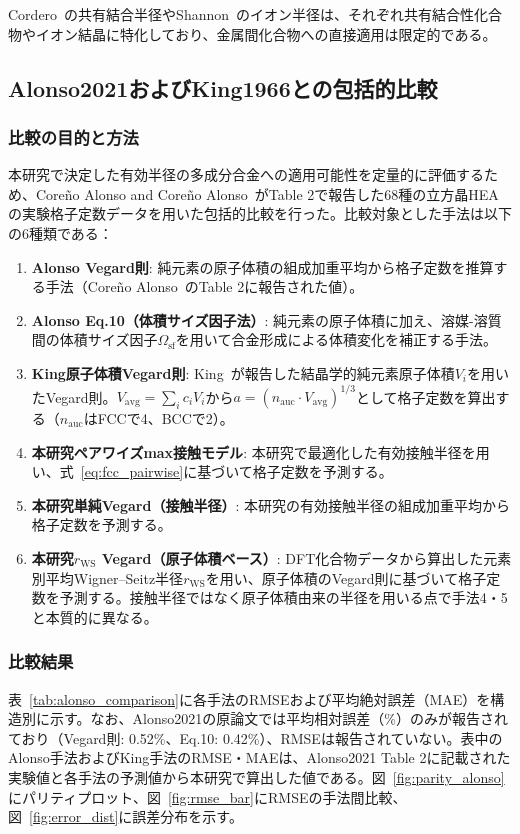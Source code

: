 \documentclass[a4paper,10pt,5p]{elsarticle}
\begin{document}
Cordero~\cite{cordero2008}の共有結合半径やShannon~\cite{shannon1976}のイオン半径は、それぞれ共有結合性化合物やイオン結晶に特化しており、金属間化合物への直接適用は限定的である。


\subsection{Alonso2021およびKing1966との包括的比較}

\subsubsection{比較の目的と方法}
本研究で決定した有効半径の多成分合金への適用可能性を定量的に評価するため、Coreño Alonso and Coreño Alonso~\cite{Alonso2021}がTable 2で報告した68種の立方晶HEAの実験格子定数データを用いた包括的比較を行った。比較対象とした手法は以下の6種類である：
\begin{enumerate}
\setlength{\parskip}{0cm}
\setlength{\itemsep}{0cm}
    \item \textbf{Alonso Vegard則}: 純元素の原子体積の組成加重平均から格子定数を推算する手法（Coreño Alonso~\cite{Alonso2021}のTable 2に報告された値）。
    \item \textbf{Alonso Eq.10（体積サイズ因子法）}: 純元素の原子体積に加え、溶媒-溶質間の体積サイズ因子$\Omega_\mathrm{sf}$を用いて合金形成による体積変化を補正する手法。
    \item \textbf{King原子体積Vegard則}: King~\cite{king1966}が報告した結晶学的純元素原子体積$V_i$を用いたVegard則。$V_\mathrm{avg} = \sum_i c_i V_i$から$a = (n_\mathrm{auc} \cdot V_\mathrm{avg})^{1/3}$として格子定数を算出する（$n_\mathrm{auc}$はFCCで4、BCCで2）。
    \item \textbf{本研究ペアワイズmax接触モデル}: 本研究で最適化した有効接触半径を用い、式~\ref{eq:fcc_pairwise}に基づいて格子定数を予測する。
    \item \textbf{本研究単純Vegard（接触半径）}: 本研究の有効接触半径の組成加重平均から格子定数を予測する。
    \item \textbf{本研究$r_\mathrm{WS}$ Vegard（原子体積ベース）}: DFT化合物データから算出した元素別平均Wigner--Seitz半径$r_\mathrm{WS}$を用い、原子体積のVegard則に基づいて格子定数を予測する。接触半径ではなく原子体積由来の半径を用いる点で手法4・5と本質的に異なる。
\end{enumerate}

\subsubsection{比較結果}
表~\ref{tab:alonso_comparison}に各手法のRMSEおよび平均絶対誤差（MAE）を構造別に示す。なお、Alonso2021の原論文では平均相対誤差（\%）のみが報告されており（Vegard則: 0.52\%、Eq.10: 0.42\%）、RMSEは報告されていない。表中のAlonso手法およびKing手法のRMSE・MAEは、Alonso2021 Table 2に記載された実験値と各手法の予測値から本研究で算出した値である。図~\ref{fig:parity_alonso}にパリティプロット、図~\ref{fig:rmse_bar}にRMSEの手法間比較、図~\ref{fig:error_dist}に誤差分布を示す。
\end{document}
